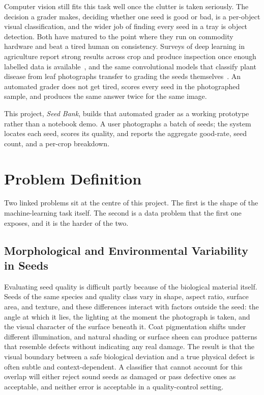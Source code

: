 Computer vision still fits this task well once the clutter is taken seriously. The
decision a grader makes, deciding whether one seed is good or bad, is a per-object
visual classification, and the wider job of finding every seed in a tray is object
detection. Both have matured to the point where they run on commodity hardware and
beat a tired human on consistency. Surveys of deep learning in agriculture report
strong results across crop and produce inspection once enough labelled data is
available~\cite{kamilaris2018deepag}, and the same convolutional models that
classify plant disease from leaf photographs transfer to grading the seeds
themselves~\cite{mohanty2016plant}. An automated grader does not get tired, scores
every seed in the photographed sample, and produces the same answer twice for the
same image.

This project, \textit{Seed Bank}, builds that automated grader as a working
prototype rather than a notebook demo. A user photographs a batch of seeds; the system
locates each seed, scores its quality, and reports the aggregate good-rate, seed count,
and a per-crop breakdown.

\section{Problem Definition}

Two linked problems sit at the centre of this project. The first is the shape of
the machine-learning task itself. The second is a data problem that the first one
exposes, and it is the harder of the two.

\subsection{Morphological and Environmental Variability in Seeds}

Evaluating seed quality is difficult partly because of the biological material
itself. Seeds of the same species and quality class vary in shape, aspect ratio,
surface area, and texture, and these differences interact with factors outside the
seed: the angle at which it lies, the lighting at the moment the photograph is
taken, and the visual character of the surface beneath it. Coat pigmentation
shifts under different illumination, and natural shading or surface sheen can
produce patterns that resemble defects without indicating any real damage. The
result is that the visual boundary between a safe biological deviation and a true
physical defect is often subtle and context-dependent. A classifier that cannot
account for this overlap will either reject sound seeds as damaged or pass
defective ones as acceptable, and neither error is acceptable in a quality-control
setting.

